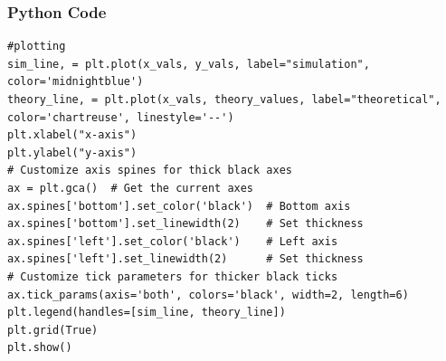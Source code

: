 \documentclass{beamer}
\begin{document}
\begin{frame}[fragile]
  \frametitle{Python Code }

\begin{verbatim}   
#plotting
sim_line, = plt.plot(x_vals, y_vals, label="simulation", color='midnightblue')
theory_line, = plt.plot(x_vals, theory_values, label="theoretical", color='chartreuse', linestyle='--')
plt.xlabel("x-axis")
plt.ylabel("y-axis")
# Customize axis spines for thick black axes
ax = plt.gca()  # Get the current axes
ax.spines['bottom'].set_color('black')  # Bottom axis
ax.spines['bottom'].set_linewidth(2)    # Set thickness
ax.spines['left'].set_color('black')    # Left axis
ax.spines['left'].set_linewidth(2)      # Set thickness
# Customize tick parameters for thicker black ticks
ax.tick_params(axis='both', colors='black', width=2, length=6)
plt.legend(handles=[sim_line, theory_line])
plt.grid(True)
plt.show()
\end{verbatim}
\end{frame}
\end{document}
